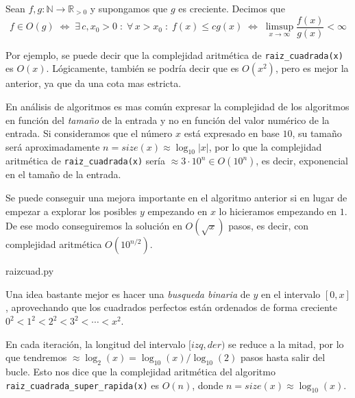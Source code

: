 \documentclass[a4paper, 11pt]{article}
\newcommand{\NN}{\mathbb{N}}
\newcommand{\RR}{\mathbb{R}}
\theoremstyle{plain}
\theoremstyle{definition}
\begin{document}
\bigskip

Sean $f,g:\NN\to\RR_{>0}$ y supongamos que $g$ es creciente. Decimos que
\[
   f\in O(g)\;\Longleftrightarrow\;
     \exists\,c,x_0>0\;:\;
     \forall\,x>x_0\;:\;
     f(x)\leq cg(x)\;\Longleftrightarrow\;
     \limsup_{x\to\infty}\frac{f(x)}{g(x)}<\infty
\]

\bigskip

Por ejemplo, se puede decir que la complejidad aritmética de
\texttt{raiz\_cuadrada(x)} es $O(x)$. Lógicamente, también se podría decir
que es $O(x^2)$, pero es mejor la anterior, ya que da una cota mas
estricta.

\bigskip

En análisis de algoritmos es mas común expresar la complejidad de los
algoritmos en función del \emph{tamaño} de la entrada y no en función
del valor numérico de la entrada. Si consideramos que el número $x$
está expresado en base $10$, su tamaño será aproximadamente
$n=size(x)\approx\log_{10}|x|$, por lo que la complejidad aritmética de
\texttt{raiz\_cuadrada(x)} sería $\approx 3\cdot 10^n\in O(10^n)$,
es decir, exponencial en el tamaño de la entrada.

\bigskip

Se puede conseguir una mejora importante en el algoritmo anterior si
en lugar de empezar a explorar los posibles $y$ empezando en $x$ lo
hicieramos empezando en $1$. De ese modo conseguiremos la solución en
$O(\sqrt{x})$ pasos, es decir, con complejidad aritmética $O(10^{n/2})$.

\bigskip


{raizcuad.py}

\bigskip

Una idea bastante mejor es hacer una \emph{busqueda binaria} de $y$ en el
intervalo $[0,x]$, aprovechando que los cuadrados perfectos están
ordenados de forma creciente $0^2<1^2<2^2<3^2<\cdots<x^2$.

\bigskip



\bigskip

En cada iteración, la longitud del intervalo $[izq,der)$ se reduce a
la mitad, por lo que tendremos $\approx\log_2(x)=\log_{10}(x)/\log_{10}(2)$
pasos hasta salir del bucle. Esto nos dice que la complejidad aritmética
del algoritmo \texttt{raiz\_cuadrada\_super\_rapida(x)} es $O(n)$, donde
$n=size(x)\approx\log_{10}(x)$.
\end{document}
